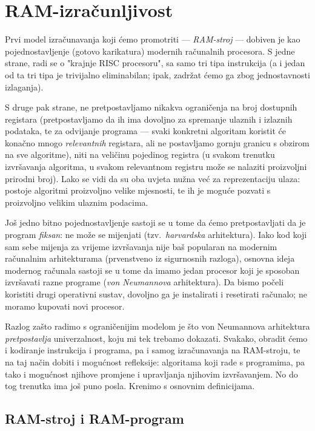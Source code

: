 \chapter{RAM-izračunljivost}

Prvi model izračunavanja koji ćemo promotriti --- \emph{RAM-stroj} --- dobiven je kao pojednostavljenje (gotovo karikatura) modernih računalnih procesora. S jedne strane, radi se o "krajnje RISC procesoru", sa samo tri tipa instrukcija (a i jedan od ta tri tipa je trivijalno eliminabilan; ipak, zadržat ćemo ga zbog jednostavnosti izlaganja).

S druge pak strane, ne pretpostavljamo nikakva ograničenja na broj dostupnih registara (pretpostavljamo da ih ima dovoljno za spremanje ulaznih i izlaznih podataka, te za odvijanje programa --- svaki konkretni algoritam koristit će konačno mnogo \emph{relevantnih} registara, ali ne postavljamo gornju granicu s obzirom na sve algoritme), niti na veličinu pojedinog registra (u svakom trenutku izvršavanja algoritma, u svakom relevantnom registru može se nalaziti proizvoljni prirodni broj). Lako se vidi da su oba uvjeta nužna već za reprezentaciju ulaza: postoje algoritmi proizvoljno velike mjesnosti, te ih je moguće pozvati s proizvoljno velikim ulaznim podacima.

Još jedno bitno pojednostavljenje sastoji se u tome da ćemo pretpostavljati da je program \emph{fiksan}: ne može se mijenjati (tzv.\ \emph{harvardska} arhitektura). Iako kod koji sam sebe mijenja za vrijeme izvršavanja nije baš popularan na modernim računalnim arhitekturama (prvenstveno iz sigurnosnih razloga), osnovna ideja modernog računala sastoji se u tome da imamo jedan procesor koji je sposoban izvršavati razne programe (\emph{von Neumannova} arhitektura). Da bismo počeli koristiti drugi operativni sustav, dovoljno ga je instalirati i resetirati računalo; ne moramo kupovati novi procesor.

Razlog zašto radimo s ograničenijim modelom je što von Neumannova arhitektura \emph{pretpostavlja} univerzalnost, koju mi tek trebamo dokazati. Svakako, obradit ćemo i kodiranje instrukcija i programa, pa i samog izračunavanja na RAM-stroju, te na taj način dobiti i mogućnost refleksije: algoritama koji rade s programima, pa tako i mogućnost njihove promjene i upravljanja njihovim izvršavanjem. No do tog trenutka ima još puno posla. Krenimo s osnovnim definicijama.

\section{RAM-stroj i RAM-program}\label{sec:RAMizr}

